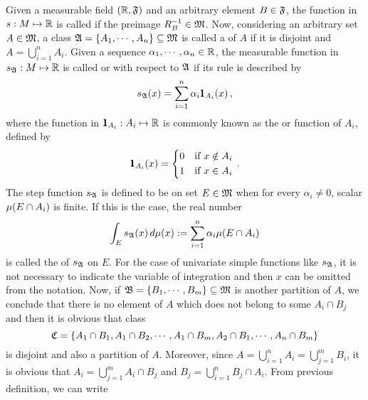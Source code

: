 Given a measurable field $(\mathbb{R},\mathfrak{F})$ and an arbitrary element ${B}\in\mathfrak{F}$, the function in $s : M \mapsto \mathbb{R}$ is called  if the preimage ${R}^{-1}_{{B}} \in \mathfrak{M}$. 
Now, considering an arbitrary set $A\in\mathfrak{M}$, a class $\mathfrak{A}=\{A_1,\cdots,A_n\}\subseteq\mathfrak{M}$ is called a  of $A$ if it is disjoint and $A=\bigcup_{i=1}^nA_i$. Given a sequence $\alpha_1,\cdots,\alpha_n\in\mathbb{R}$, the measurable function in $s_{\mathfrak{A}} : M \mapsto \mathbb{R}$ is called  or  with respect to $\mathfrak{A}$ if its rule is described by
\begin{equation}
s_{\mathfrak{A}}(x) = \sum_{i=1}^n\alpha_i\pmb{1}_{A_i}(x)\,,
\end{equation}
where the function in $\pmb{1}_{A_i} : A_i \mapsto \mathbb{R}$ is commonly known as the  or  function of $A_i$, defined by
\begin{equation*}
\pmb{1}_{A_i}(x)=
\begin{dcases}
0 & \text{if } x\notin A_i\\
1 & \text{if } x\in A_i
\end{dcases}\,.
\end{equation*}
The step function $s_{\mathfrak{A}}$ is defined to be  on set $E\in\mathfrak{M}$ when for every $\alpha_i\neq 0$, scalar $\mu(E\cap A_i)$ is finite. If this is the case, the real number
\begin{equation}\label{eq:defInteSimp}
\int_E s_{\mathfrak{A}}(x) \,d\mu(x) := \sum_{i=1}^n\alpha_i\mu(E\cap A_i)
\end{equation}
is called the  of $s_{\mathfrak{A}}$ on $E$. For the case of univariate simple functions like $s_{\mathfrak{A}}$, it is not necessary to indicate the variable of integration and then $x$ can be omitted from the notation. Now, if $\mathfrak{B}=\{B_1,\cdots,B_m\}\subseteq\mathfrak{M}$ is another partition of $A$, we conclude that there is no element of $A$ which does not belong to some $A_i\cap B_j$ and then it is obvious that class 
\begin{equation*}
\mathfrak{C}=\{A_1\cap B_1,A_1\cap B_2,\cdots,A_1\cap B_m,A_2\cap B_1,\cdots,A_n\cap B_m\}
\end{equation*}
is disjoint and also a partition of $A$. Moreover, since $A=\bigcup_{i=1}^n A_i=\bigcup_{j=1}^m B_i$, it is obvious that $A_i=\bigcup_{j=1}^mA_i\cap B_j$ and $B_j=\bigcup_{i=1}^n B_j \cap A_i$. From previous definition, we can write
